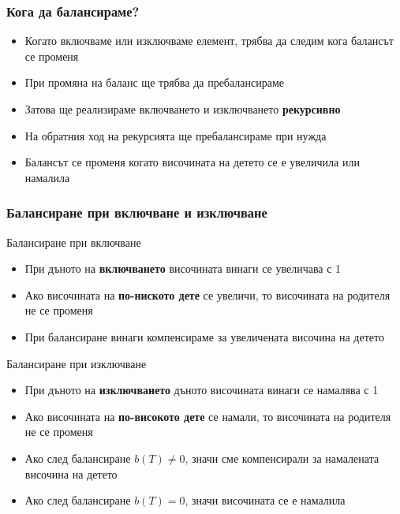 \documentclass{beamer}
\begin{document}
\begin{frame}
  \frametitle{Кога да балансираме?}
  \begin{itemize}[<+->]
  \item Когато включваме или изключваме елемент, трябва да следим кога балансът се променя
  \item При промяна на баланс ще трябва да пребалансираме
  \item Затова ще реализираме включването и изключването \textbf{рекурсивно}
  \item На обратния ход на рекурсията ще пребалансираме при нужда
  \item Балансът се променя когато височината на детето се е увеличила или намалила
  \end{itemize}
\end{frame}

\begin{frame}
  \frametitle{Балансиране при включване и изключване}
  Балансиране при включване
  \onslide<+->
  \begin{itemize}[<+->]
  \item При дъното на \textbf{включването} височината винаги се увеличава с 1
  \item Ако височината на \textbf{по-ниското дете} се увеличи, то височината на родителя не се променя
  \item При балансиране винаги компенсираме за увеличената височина на детето
  \end{itemize}
  \onslide<+->
  Балансиране при изключване
  \begin{itemize}[<+->]
  \item При дъното на \textbf{изключването} дъното височината винаги се намалява с 1
  \item Ако височината на \textbf{по-високото дете} се намали, то височината на родителя не се променя
  \item Ако след балансиране $b(T) \neq 0$, значи сме компенсирали за намалената височина на детето
  \item Ако след балансиране $b(T) = 0$, значи височината се е намалила
  \end{itemize}
\end{frame}
\end{document}
